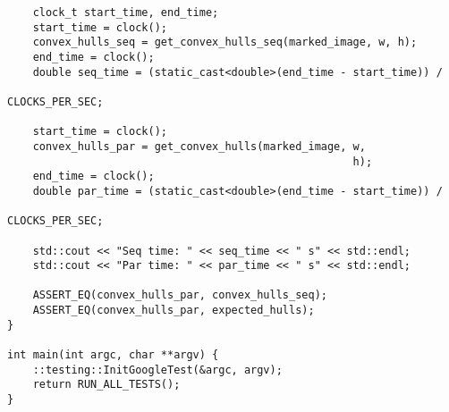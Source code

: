 \documentclass{report}
\begin{document}
\begin{lstlisting}
    clock_t start_time, end_time;
    start_time = clock();
    convex_hulls_seq = get_convex_hulls_seq(marked_image, w, h);
    end_time = clock();
    double seq_time = (static_cast<double>(end_time - start_time)) /
                                                                CLOCKS_PER_SEC;

    start_time = clock();
    convex_hulls_par = get_convex_hulls(marked_image, w,
                                                      h);
    end_time = clock();
    double par_time = (static_cast<double>(end_time - start_time)) /
                                                                CLOCKS_PER_SEC;

    std::cout << "Seq time: " << seq_time << " s" << std::endl;
    std::cout << "Par time: " << par_time << " s" << std::endl;

    ASSERT_EQ(convex_hulls_par, convex_hulls_seq);
    ASSERT_EQ(convex_hulls_par, expected_hulls);
}

int main(int argc, char **argv) {
    ::testing::InitGoogleTest(&argc, argv);
    return RUN_ALL_TESTS();
}
\end{lstlisting}
\end{document}
